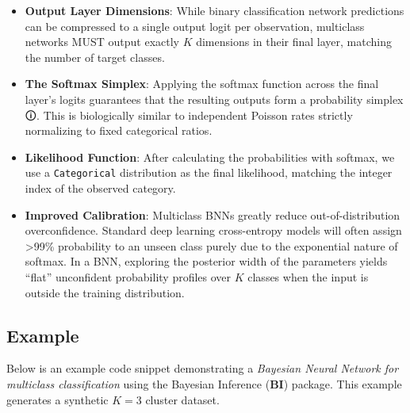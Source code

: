 \documentclass[
  letterpaper,
  DIV=11,
  numbers=noendperiod]{scrartcl}
\providecommand{\tightlist}{%
  \setlength{\itemsep}{0pt}\setlength{\parskip}{0pt}}
\begin{document}
\begin{tcolorbox}[enhanced jigsaw, colback=white, breakable, left=2mm, arc=.35mm, colbacktitle=quarto-callout-note-color!10!white, colframe=quarto-callout-note-color-frame, leftrule=.75mm, opacityback=0, title=\textcolor{quarto-callout-note-color}{\faInfo}\hspace{0.5em}{Note}, titlerule=0mm, coltitle=black, rightrule=.15mm, toprule=.15mm, bottomtitle=1mm, toptitle=1mm, bottomrule=.15mm, opacitybacktitle=0.6]

\begin{itemize}
\tightlist
\item
  \textbf{Output Layer Dimensions}: While binary classification network
  predictions can be compressed to a single output logit per
  observation, multiclass networks MUST output exactly \(K\) dimensions
  in their final layer, matching the number of target classes.
\item
  \textbf{The Softmax Simplex}: Applying the softmax function across the
  final layer's logits guarantees that the resulting outputs form a
  probability \label{simplex}{{simplex 🛈}}. This is
  biologically similar to independent Poisson rates strictly normalizing
  to fixed categorical ratios.
\item
  \textbf{Likelihood Function}: After calculating the probabilities with
  softmax, we use a \texttt{Categorical} distribution as the final
  likelihood, matching the integer index of the observed category.
\item
  \textbf{Improved Calibration}: Multiclass BNNs greatly reduce
  out-of-distribution overconfidence. Standard deep learning
  cross-entropy models will often assign \textgreater99\% probability to
  an unseen class purely due to the exponential nature of softmax. In a
  BNN, exploring the posterior width of the parameters yields ``flat''
  unconfident probability profiles over \(K\) classes when the input is
  outside the training distribution.
\end{itemize}

\end{tcolorbox}

\subsection{Example}\label{example}

Below is an example code snippet demonstrating a \emph{Bayesian Neural
Network for multiclass classification} using the Bayesian Inference
(\textbf{BI}) package. This example generates a synthetic \(K=3\)
cluster dataset.
\end{document}
